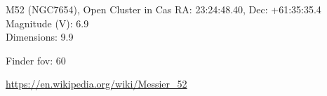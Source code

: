 \begin{block}{M52 (NGC7654), Open Cluster in Cas}
    RA: 23:24:48.40, Dec: +61:35:35.4 \\ 
    Magnitude (V): 6.9 \\ 
    Dimensions: 9.9 

    Finder fov: 60 

    \url{https://en.wikipedia.org/wiki/Messier_52} 
\end{block}